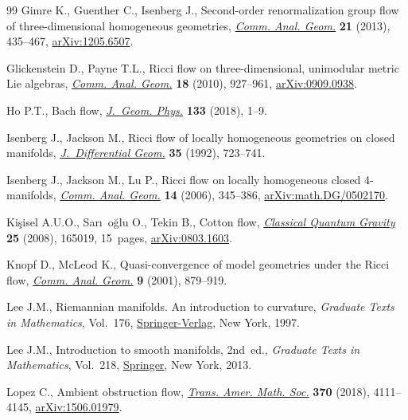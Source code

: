 \documentclass[pdftex]{sigma}
\numberwithin{equation}{section}
\begin{document}
\begin{thebibliography}{99}
Gimre K., Guenther C., Isenberg J., Second-order renormalization group flow of
 three-dimensional homogeneous geometries, \href{https://doi.org/10.4310/CAG.2013.v21.n2.a7}{\textit{Comm. Anal. Geom.}} \textbf{21} (2013), 435--467, \href{https://arxiv.org/abs/1205.6507}{arXiv:1205.6507}.

Glickenstein D., Payne T.L., Ricci flow on three-dimensional, unimodular metric
 {L}ie algebras, \href{https://doi.org/10.4310/CAG.2010.v18.n5.a3}{\textit{Comm. Anal. Geom.}} \textbf{18} (2010), 927--961, \href{https://arxiv.org/abs/0909.0938}{arXiv:0909.0938}.

Ho P.T., Bach flow, \href{https://doi.org/10.1016/j.geomphys.2018.07.008}{\textit{J.~Geom. Phys.}} \textbf{133} (2018), 1--9.

Isenberg J., Jackson M., Ricci flow of locally homogeneous geometries on closed
 manifolds, \href{https://doi.org/10.4310/jdg/1214448265}{\textit{J.~Differential Geom.}} \textbf{35} (1992), 723--741.

Isenberg J., Jackson M., Lu P., Ricci flow on locally homogeneous closed
 4-manifolds, \href{https://dx.doi.org/10.4310/CAG.2006.v14.n2.a5}{\textit{Comm. Anal. Geom.}} \textbf{14} (2006), 345--386, \href{https://arxiv.org/abs/math.DG/0502170}{arXiv:math.DG/0502170}.

Ki\c{s}isel A.U.O., Sar\i~o\u{g}lu O., Tekin B., Cotton flow, \href{https://doi.org/10.1088/0264-9381/25/16/165019}{\textit{Classical
 Quantum Gravity}} \textbf{25} (2008), 165019, 15~pages, \href{https://arxiv.org/abs/0803.1603}{arXiv:0803.1603}.

Knopf D., McLeod K., Quasi-convergence of model geometries under the {R}icci
 flow, \href{https://doi.org/10.4310/CAG.2001.v9.n4.a7}{\textit{Comm. Anal. Geom.}} \textbf{9} (2001), 879--919.

Lee J.M., Riemannian manifolds. An introduction to curvature, \textit{Graduate
 Texts in Mathematics}, Vol.~176, \href{https://doi.org/10.1007/b98852}{Springer-Verlag}, New York, 1997.

Lee J.M., Introduction to smooth manifolds, 2nd~ed., \textit{Graduate Texts in
 Mathematics}, Vol.~218, \href{https://doi.org/10.1007/978-1-4419-9982-5}{Springer}, New York, 2013.

Lopez C., Ambient obstruction flow, \href{https://doi.org/10.1090/tran/7106}{\textit{Trans. Amer. Math. Soc.}} \textbf{370} (2018), 4111--4145, \href{https://arxiv.org/abs/1506.01979}{arXiv:1506.01979}.


\end{thebibliography}
\end{document}
